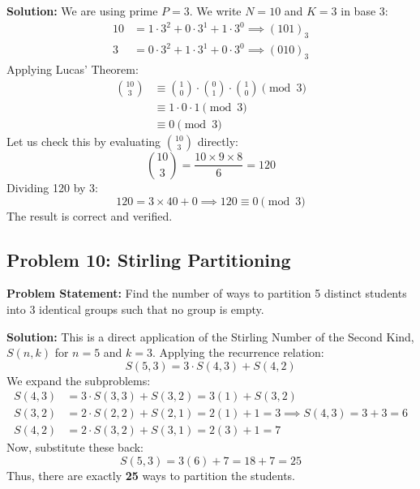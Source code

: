\documentclass[10pt,journal,compsoc,onecolumn]{IEEEtran}
\begin{document}
\textbf{Solution:}
We are using prime $P = 3$.
We write $N=10$ and $K=3$ in base $3$:
\begin{align}
10 &= 1 \cdot 3^2 + 0 \cdot 3^1 + 1 \cdot 3^0 \implies (101)_3 \\
3 &= 0 \cdot 3^2 + 1 \cdot 3^1 + 0 \cdot 3^0 \implies (010)_3
\end{align}
Applying Lucas' Theorem:
\begin{align}
\binom{10}{3} &\equiv \binom{1}{0} \cdot \binom{0}{1} \cdot \binom{1}{0} \pmod 3 \\
&\equiv 1 \cdot 0 \cdot 1 \pmod 3 \\
&\equiv 0 \pmod 3
\end{align}
Let us check this by evaluating $\binom{10}{3}$ directly:
\begin{equation}
\binom{10}{3} = \frac{10 \times 9 \times 8}{6} = 120
\end{equation}
Dividing 120 by 3:
\begin{equation}
120 = 3 \times 40 + 0 \implies 120 \equiv 0 \pmod 3
\end{equation}
The result is correct and verified.

\subsection{Problem 10: Stirling Partitioning}

\textbf{Problem Statement:}
Find the number of ways to partition 5 distinct students into 3 identical groups such that no group is empty.

\textbf{Solution:}
This is a direct application of the Stirling Number of the Second Kind, $S(n, k)$ for $n=5$ and $k=3$.
Applying the recurrence relation:
\begin{equation}
S(5, 3) = 3 \cdot S(4, 3) + S(4, 2)
\end{equation}
We expand the subproblems:
\begin{align}
S(4, 3) &= 3 \cdot S(3, 3) + S(3, 2) = 3(1) + S(3, 2) \\
S(3, 2) &= 2 \cdot S(2, 2) + S(2, 1) = 2(1) + 1 = 3 \implies S(4, 3) = 3 + 3 = 6 \\
S(4, 2) &= 2 \cdot S(3, 2) + S(3, 1) = 2(3) + 1 = 7
\end{align}
Now, substitute these back:
\begin{equation}
S(5, 3) = 3(6) + 7 = 18 + 7 = 25
\end{equation}
Thus, there are exactly \textbf{25} ways to partition the students.
\end{document}
